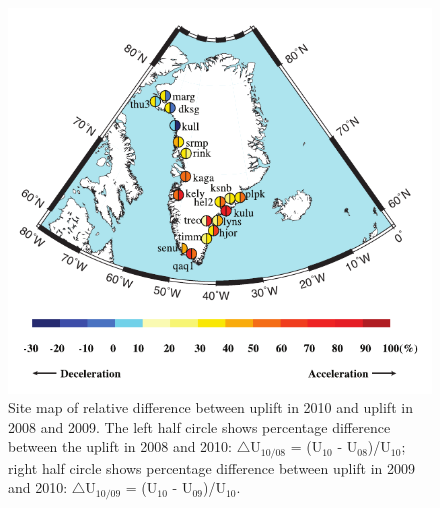 \clearpage
\begin{figure}
 \centering
 \includegraphics{figs_chpt3/2012GC004432-p15.pdf} 
 \caption[Site map of relative difference between uplift in 2010 and uplift in 2008 and 2009.]{Site map of relative difference between uplift in 2010 and uplift in 2008 and 2009. The left half circle shows percentage difference between the uplift in 2008 and 2010: $\triangle$U$_{10/08}$ = (U$_{10}$ - U$_{08}$)/U$_{10}$; right half circle shows percentage difference between uplift in 2009 and 2010: $\triangle$U$_{10/09}$ = (U$_{10}$ - U$_{09}$)/U$_{10}$.}
 \label{fig:fig15}
\end{figure}

